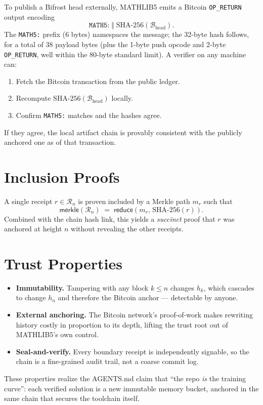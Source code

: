 To publish a Bifrost head externally, MATHLIB5 emits a Bitcoin
\texttt{OP\_RETURN} output encoding
\[
\texttt{MATH5:}\;\Vert\; \text{SHA-256}(\mathcal{B}_{\text{head}}).
\]
The \texttt{MATH5:} prefix (6 bytes) namespaces the message; the 32-byte
hash follows, for a total of 38 payload bytes (plus the 1-byte push opcode
and 2-byte \texttt{OP\_RETURN}, well within the 80-byte standard limit).
A verifier on any machine can:
\begin{enumerate}
  \item Fetch the Bitcoin transaction from the public ledger.
  \item Recompute $\text{SHA-256}(\mathcal{B}_{\text{head}})$ locally.
  \item Confirm \texttt{MATH5:} matches and the hashes agree.
\end{enumerate}
If they agree, the local artifact chain is provably consistent with the
publicly anchored one as of that transaction.

\section{Inclusion Proofs}
\label{sec:bifrost-inclusion}

A single receipt $r \in \mathcal{R}_n$ is proven included by a Merkle
path $m_r$ such that
\[
\mathsf{merkle}(\mathcal{R}_n) \;=\; \mathsf{reduce}(m_r,\, \text{SHA-256}(r)).
\]
Combined with the chain hash link, this yields a \emph{succinct} proof that
$r$ was anchored at height $n$ without revealing the other receipts.

\section{Trust Properties}
\label{sec:bifrost-trust}

\begin{itemize}
  \item \textbf{Immutability.} Tampering with any block $k \le n$ changes
        $h_k$, which cascades to change $h_n$ and therefore the Bitcoin
        anchor --- detectable by anyone.
  \item \textbf{External anchoring.} The Bitcoin network's proof-of-work
        makes rewriting history costly in proportion to its depth, lifting
        the trust root out of MATHLIB5's own control.
  \item \textbf{Seal-and-verify.} Every boundary receipt is independently
        signable, so the chain is a fine-grained audit trail, not a coarse
        commit log.
\end{itemize}
These properties realize the AGENTS.md claim that ``the repo \emph{is} the
training curve'': each verified solution is a new immutable memory bucket,
anchored in the same chain that secures the toolchain itself.
